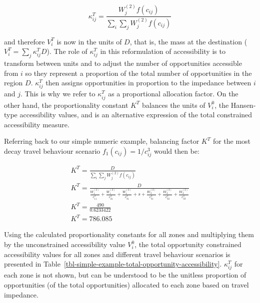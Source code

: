\documentclass[
  10pt,
  letterpaper,
]{article}
\begin{document}
\[
\kappa_{ij}^T = \frac{W^{(2)}_j f(c_{ij})}{\sum_i\sum_j W^{(2)}_jf(c_{ij})}
\]

\noindent and therefore \(V^T_i\) is now in the units of \(D\), that is,
the mass at the destination (\(V^T_i = \sum_j \kappa_{ij}^T D\)). The
role of \(\kappa_{ij}^T\) in this reformulation of accessibility is to
transform between units and to adjust the number of opportunities
accessible from \(i\) so they represent a proportion of the total number
of opportunities in the region \(D\). \(\kappa_{ij}^T\) then assigns
opportunities in proportion to the impedance between \(i\) and \(j\).
This is why we refer to \(\kappa_{ij}^T\) as a proportional allocation
factor. On the other hand, the proportionality constant \(K^T\) balances
the units of \(V^0_i\), the Hansen-type accessibility values, and is an
alternative expression of the total constrained accessibility measure.

Referring back to our simple numeric example, balancing factor \(K^T\)
for the most decay travel behaviour scenario
\(f_1(c_{ij}) = 1/c_{ij}^3\) would then be:

\[
\begin{array}{l}
K^T = \frac{D}{\sum_{i}\sum_{j} W_j^{(2)} f(c_{ij})}\\
K^T = \frac{D}{\frac{W_1^{(2)}}{c_{11}^3}+\frac{W_1^{(2)}}{c_{21}^3} + \frac{W_1^{(2)}}{c_{31}^3} + s + \frac{W_3^{(2)}}{c_{31}^3} + \frac{W_3^{(2)}}{c_{32}^3} + \frac{W_3^{(2)}}{c_{33}^3}
}\\
K^T = \frac{490}{0.6233422} \\
K^T = 786.085
\end{array}
\]

Using the calculated proportionality constants for all zones and
multiplying them by the unconstrained accessibility value \(V^0_i\), the
total opportunity constrained accessibility values for all zones and
different travel behaviour scenarios is presented in
Table~\ref{tbl-simple-example-total-opportunity-accessibility}.
\(\kappa_{ij}^T\) for each zone is not shown, but can be understood to
be the unitless proportion of opportunities (of the total opportunities)
allocated to each zone based on travel impedance.
\end{document}

